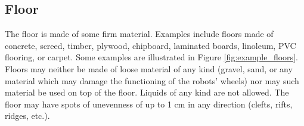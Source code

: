 \subsection{Floor}
The floor is made of some firm material. Examples include floors made of concrete, screed, timber, plywood, chipboard, laminated boards, linoleum, PVC flooring, or carpet. Some examples are illustrated in Figure \ref{fig:example_floors}. Floors may neither be made of loose material of any kind (gravel, sand, or any material which may damage the functioning of the robots' wheels) nor may such material be used on top of the floor. Liquids of any kind are not allowed. The floor may have spots of unevenness of up to 1 cm in any direction (clefts, rifts, ridges, etc.).

\begin{figure} [h!]
\begin{center}
 \hspace{0.1cm}
 \hspace{0.1cm}
 \hspace{0.1cm}
 \hspace{0.1cm}
\\

\end{center}
\end{figure}
